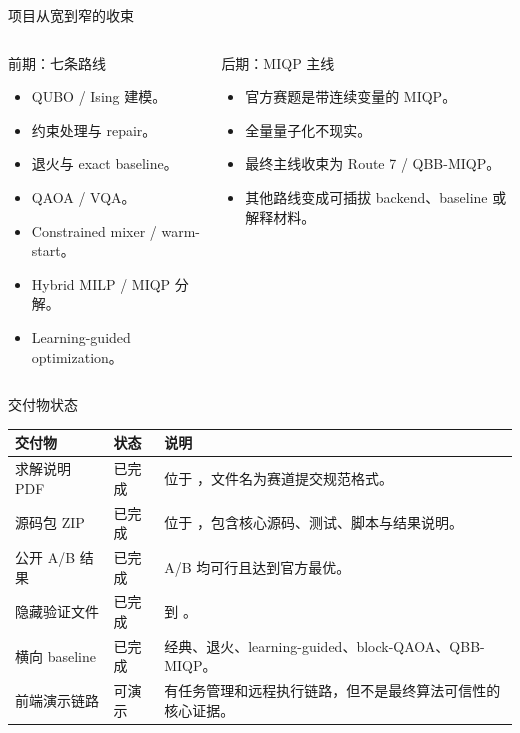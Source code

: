 \documentclass[aspectratio=169]{beamer}
\newcommand{\good}[1]{\textcolor{green!45!black}{#1}}
\newcommand{\warn}[1]{\textcolor{orange!80!black}{#1}}
\begin{document}
\begin{frame}{项目从宽到窄的收束}
\small
\begin{columns}[T,onlytextwidth]
\begin{column}{0.48\textwidth}
\begin{block}{前期：七条路线}
\begin{itemize}
  \item QUBO / Ising 建模。
  \item 约束处理与 repair。
  \item 退火与 exact baseline。
  \item QAOA / VQA。
  \item Constrained mixer / warm-start。
  \item Hybrid MILP / MIQP 分解。
  \item Learning-guided optimization。
\end{itemize}
\end{block}
\end{column}
\begin{column}{0.48\textwidth}
\begin{alertblock}{后期：MIQP 主线}
\begin{itemize}
  \item 官方赛题是带连续变量的 MIQP。
  \item 全量量子化不现实。
  \item 最终主线收束为 Route 7 / QBB-MIQP。
  \item 其他路线变成可插拔 backend、baseline 或解释材料。
\end{itemize}
\end{alertblock}
\end{column}
\end{columns}
\end{frame}

\begin{frame}{交付物状态}
\small
\begin{tabularx}{\linewidth}{p{3.4cm}p{2.2cm}Y}
\toprule
交付物 & 状态 & 说明 \\
\midrule
求解说明 PDF & \good{已完成} & 位于 ，文件名为赛道提交规范格式。\\
源码包 ZIP & \good{已完成} & 位于 ，包含核心源码、测试、脚本与结果说明。\\
公开 A/B 结果 & \good{已完成} & A/B 均可行且达到官方最优。\\
隐藏验证文件 & \good{已完成} &  到 。\\
横向 baseline & \good{已完成} & 经典、退火、learning-guided、block-QAOA、QBB-MIQP。\\
前端演示链路 & \warn{可演示} & 有任务管理和远程执行链路，但不是最终算法可信性的核心证据。\\
\bottomrule
\end{tabularx}
\end{frame}
\end{document}

